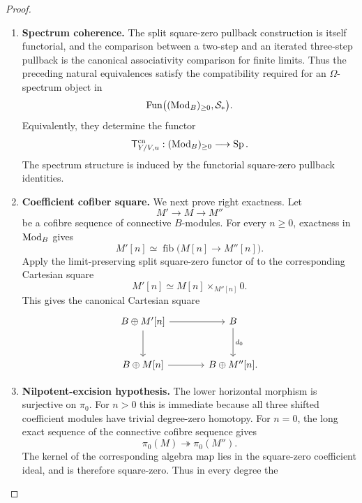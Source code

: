 \begin{proof}
\begin{enumerate}[label=\textup{(\arabic*)}]
    homotopy pullback square of mapping spaces. After passing to the slice over
    \(V\) and taking the homotopy fibre over the chosen point \(u\), the
    retractive self-intersection lemma
     gives a natural equivalence
    \[
        \mathsf T^n_{Y/V,u}(M)
        \xrightarrow{\simeq}
        \Omega\mathsf T^{n+1}_{Y/V,u}(M).
    \]
    \item \textbf{Spectrum coherence.}
    The split square-zero pullback construction is itself functorial, and the
    comparison between a two-step and an iterated three-step pullback is the
    canonical associativity comparison for finite limits. Thus the preceding
    natural equivalences satisfy the compatibility required for an
    \(\Omega\)-spectrum object in
    \[
        \operatorname{Fun}\bigl((\operatorname{Mod}_B)_{\geq0},\mathcal S_*\bigr).
    \]
    Equivalently, they determine the functor
    \[
        \mathsf T^{\mathrm{cn}}_{Y/V,u}:
        (\operatorname{Mod}_B)_{\geq0}\longrightarrow\operatorname{Sp}.
    \]
    The spectrum structure is induced by the functorial square-zero pullback
    identities.
    \item \textbf{Coefficient cofiber square.}
    We next prove right exactness. Let
    \[
        M'\longrightarrow M\longrightarrow M''
    \]
    be a cofibre sequence of connective \(B\)-modules. For every \(n\geq0\),
    exactness in \(\operatorname{Mod}_B\) gives
    \[
        M'[n]\simeq\operatorname{fib}\bigl(M[n]\to M''[n]\bigr).
    \]
    Apply the limit-preserving split square-zero functor of
     to the corresponding Cartesian
    square
    \[
        M'[n]\simeq M[n]\times_{M''[n]}0.
    \]
    This gives the canonical Cartesian square
    \[
    \begin{tikzcd}[column sep=large,row sep=large]
        B\oplus M'[n] \arrow[r] \arrow[d]
            & B \arrow[d,"d_0"]
        \\
        B\oplus M[n] \arrow[r]
            & B\oplus M''[n].
    \end{tikzcd}
    \]
    \item \textbf{Nilpotent-excision hypothesis.}
    The lower horizontal morphism is surjective on \(\pi_0\). For \(n>0\) this
    is immediate because all three shifted coefficient modules have trivial
    degree-zero homotopy. For \(n=0\), the long exact sequence of the connective
    cofibre sequence gives
    \[
        \pi_0(M)\twoheadrightarrow\pi_0(M'').
    \]
    The kernel of the corresponding algebra map lies in the square-zero
    coefficient ideal, and is therefore square-zero. Thus in every degree the

\end{enumerate}
\end{proof}
